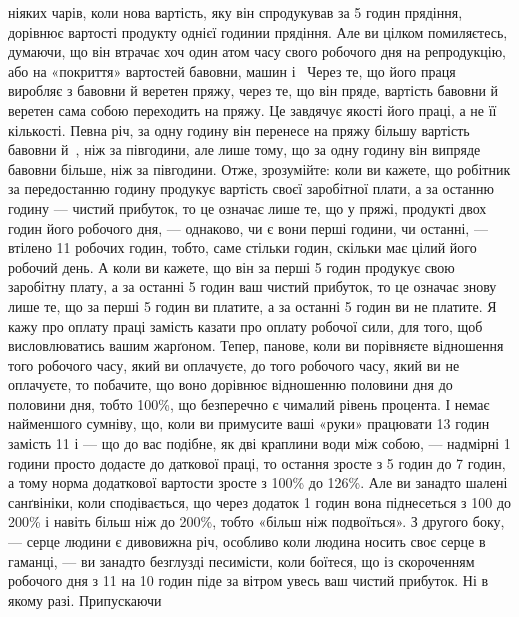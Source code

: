\parcont{}  %
ніяких чарів, коли нова вартість, яку він спродукував за 5 годин прядіння, дорівнює вартості
продукту однієї годинии прядіння. Але ви цілком помиляєтесь, думаючи, що він втрачає хоч один атом
часу свого робочого дня на репродукцію, або на «покриття» вартостей бавовни, машин і~ Через
те, що його праця виробляє з бавовни й веретен пряжу, через те, що він пряде, вартість бавовни й
веретен сама собою переходить на пряжу. Це завдячує якості його праці, а не її кількості. Певна річ, за одну годину він перенесе на пряжу
більшу вартість бавовни й~, ніж за півгодини, але лише тому, що за одну годину він випряде
бавовни більше, ніж за півгодини. Отже, зрозумійте: коли ви кажете, що робітник за передостанню
годину продукує вартість своєї заробітної плати, а за останню годину — чистий прибуток, то це
означає лише те, що у пряжі, продукті двох годин його робочого дня, — однаково, чи є вони перші
години, чи останні, — втілено 11 робочих годин, тобто, саме стільки годин, скільки має цілий
його робочий день. А коли ви кажете, що він за перші 5 годин продукує свою заробітну плату, а за
останні 5 годин ваш чистий прибуток, то це означає знову лише те, що за перші 5 годин ви
платите, а за останні 5 годин
ви не платите. Я кажу про оплату праці замість казати про оплату робочої сили, для того, щоб
висловлюватись вашим жарґоном. Тепер, панове, коли ви порівняєте відношення того робочого
часу, який ви оплачуєте, до того робочого часу, який ви не оплачуєте, то побачите, що воно дорівнює
відношенню половини дня до половини дня, тобто 100\%, що безперечно є чималий рівень процента. І
немає найменшого сумніву, що, коли ви примусите ваші «руки» працювати 13 годин замість 11 і — що
до вас подібне, як дві краплини води між собою, — надмірні 1 години просто додасте до даткової
праці, то остання зросте з 5 годин до 7 годин, а тому норма додаткової вартости зросте з
100\% до 126\%. Але ви занадто шалені санґвініки, коли сподівається, що через додаток 1 годин
вона піднесеться з 100 до 200\% і навіть більш ніж до 200\%, тобто «більш ніж подвоїться». З другого
боку, — серце людини є дивовижна річ, особливо коли людина носить своє серце в гаманці, — ви занадто
безглузді песимісти, коли боїтеся, що із скороченням робочого
дня з 11 на 10 годин піде за вітром увесь ваш чистий прибуток. Ні в якому разі. Припускаючи
